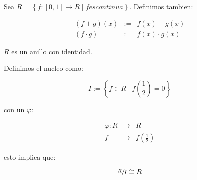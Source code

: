         \begin{ejemplo}
            Sea $R = \left\{ f:[0, 1] \to R \mid f es continua \right\}$. Definimos tambien:

            \begin{eqnarray*}
                (f+g)(x) & := & f(x) + g(x) \\
                (f \cdot g) & := & f(x) \cdot g(x)
            \end{eqnarray*}

            $R$ es un anillo con identidad.

            Definimos el nucleo como:

            \begin{equation*}
                I := \left\{ f \in R \mid f \left( \frac{1}{2} \right) = 0 \right\}
            \end{equation*}

            con un $\varphi$:

            \begin{eqnarray}
                \varphi: R & \to & R \\
                f & \to & f \left( \frac{1}{2} \right)
            \end{eqnarray}

            esto implica que:

            \begin{equation*}
                \sfrac{R}{I} \cong R
            \end{equation*}

        \end{ejemplo}
